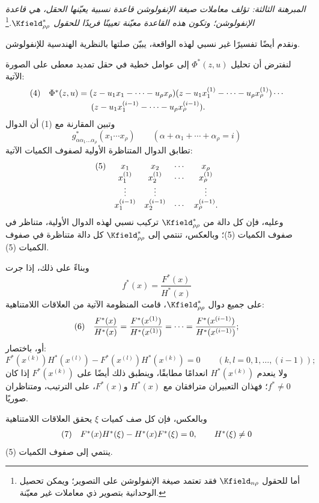 \documentclass[11pt]{article}
\newcommand{\srcLTR}[1]{\relax\ifmmode\text{\mbox{\babelsublr{\foreignlanguage{english}{#1}}}}\else\babelsublr{\foreignlanguage{english}{#1}}\fi}
\newcommand{\srcfn}[2]{\begingroup\renewcommand{\thefootnote}{\srcLTR{#1}}\footnote{#2}\addtocounter{footnote}{-1}\endgroup}
\begin{document}
\emph{المبرهنة الثالثة: تؤلف معاملات صيغة الإنفولوشن قاعدة نسبية يعيّنها الحقل، هي قاعدة الإنفولوشن؛ وتكون هذه القاعدة معيّنة تعيينًا فريدًا للحقول $\Kfield^*_{\rho\rho}$.}\srcfn{*)}{أما للحقول $\Kfield_{n\rho}$ فقد تعتمد صيغة الإنفولوشن على التصوير؛ ويمكن تحصيل الوحدانية بتصوير ذي معاملات غير معيّنة.}

ونقدم أيضًا تفسيرًا غير نسبي لهذه الواقعة، يبيّن صلتها بالنظرية الهندسية للإنفولوشن.

لنفترض أن تحليل $\Phi^*(z,u)$ إلى عوامل خطية في حقل تمديد معطى على الصورة الآتية:
\[
\begin{array}{@{}l@{\quad}l@{}}
(4)& \Phi^*(z,u)=(z-u_1x_1-\cdots-u_\rho x_\rho)(z-u_1x_1^{(1)}-\cdots-u_\rho x_\rho^{(1)})\cdots\\[0.25em]
& \qquad\qquad\quad (z-u_1x_1^{(i-1)}-\cdots-u_\rho x_\rho^{(i-1)}).
\end{array}
\]
وتبين المقارنة مع (1) أن الدوال
\[
g^*_{\alpha\alpha_1\ldots\alpha_\rho}(x_1\cdots x_\rho)\qquad(\alpha+\alpha_1+\cdots+\alpha_\rho=i)
\]
تطابق الدوال المتناظرة الأولية لصفوف الكميات الآتية:
\[
\begin{array}{@{}l@{\quad}cccc@{}}
(5)&x_1&x_2&\cdots&x_\rho\\
&x_1^{(1)}&x_2^{(1)}&\cdots&x_\rho^{(1)}\\
&\vdots&\vdots&&\vdots\\
&x_1^{(i-1)}&x_2^{(i-1)}&\cdots&x_\rho^{(i-1)}.
\end{array}
\]
وعليه، فإن كل دالة من $\Kfield^*_{\rho\rho}$ تركيب نسبي لهذه الدوال الأولية، متناظر في صفوف الكميات (5)؛ وبالعكس، تنتمي إلى $\Kfield^*_{\rho\rho}$ كل دالة متناظرة في صفوف الكميات (5).

وبناءً على ذلك، إذا جرت
\[
f^*(x)=\frac{F^*(x)}{H^*(x)}
\]
على جميع دوال $\Kfield^*_{\rho\rho}$، قامت المنظومة الآتية من العلاقات اللامتناهية:
\[
\begin{array}{@{}l@{\quad}c@{}}
(6)&\displaystyle \frac{F^*(x)}{H^*(x)}=\frac{F^*(x^{(1)})}{H^*(x^{(1)})}=\cdots=\frac{F^*(x^{(i-1)})}{H^*(x^{(i-1)})};
\end{array}
\]
أو، باختصار:
\[
F^*(x^{(k)})H^*(x^{(l)})-F^*(x^{(l)})H^*(x^{(k)})=0\qquad(k,l=0,1,\ldots,(i-1));
\]
ولا ينعدم $H^*(x^{(k)})$ انعدامًا مطابقًا، وينطبق ذلك أيضًا على $F^*(x^{(k)})$ إذا كان $f^*\ne0$؛ فهذان التعبيران مترافقان مع $H^*(x)$ و$F^*(x)$، على الترتيب، ومتناظران صوريًا.

وبالعكس، فإن كل صف كميات $\xi$ يحقق العلاقات اللامتناهية
\[
\begin{array}{@{}l@{\quad}c@{}}
(7)&F^*(x)H^*(\xi)-H^*(x)F^*(\xi)=0,\qquad H^*(\xi)\ne0
\end{array}
\]
ينتمي إلى صفوف الكميات (5).
\end{document}
